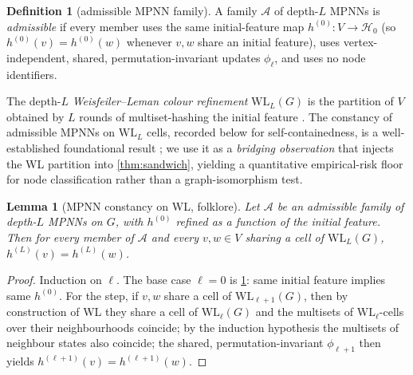 \documentclass[10pt]{article}
\newtheorem{lemma}[theorem]{Lemma}
\theoremstyle{definition}
\newtheorem{definition}[theorem]{Definition}
\theoremstyle{remark}
\begin{document}
\begin{definition}[admissible MPNN family]\label{def:admissible}
A family $\mathcal{A}$ of depth-$L$ MPNNs is \emph{admissible} if
every member uses the same initial-feature map
$h^{(0)} : V \to \mathcal{H}_{0}$ (so $h^{(0)}(v) = h^{(0)}(w)$
whenever $v, w$ share an initial feature), uses
vertex-independent, shared, permutation-invariant updates
$\phi_{\ell}$, and uses no node identifiers.
\end{definition}

The depth-$L$ \emph{Weisfeiler--Leman colour refinement}
$\mathrm{WL}_{L}(G)$ is the partition of $V$ obtained by $L$
rounds of multiset-hashing the initial feature
\citep{morris2019wl,xu2019gin}. The constancy of admissible
MPNNs on $\mathrm{WL}_{L}$ cells, recorded below for
self-containedness, is a well-established foundational result
\citep{xu2019gin,morris2019wl}; we use it as a
\emph{bridging observation} that injects the WL partition into
\cref{thm:sandwich}, yielding a quantitative empirical-risk
floor for node classification rather than a graph-isomorphism
test.

\begin{lemma}[MPNN constancy on WL, folklore]\label{lem:mpnn-wl}
Let $\mathcal{A}$ be an admissible family of depth-$L$ MPNNs on
$G$, with $h^{(0)}$ refined as a function of the initial feature.
Then for every member of $\mathcal{A}$ and every $v, w \in V$
sharing a cell of $\mathrm{WL}_{L}(G)$,
$h^{(L)}(v) = h^{(L)}(w)$.
\end{lemma}

\begin{proof}
Induction on $\ell$. The base case $\ell = 0$ is
\cref{def:admissible}: same initial feature implies same
$h^{(0)}$. For the step, if $v, w$ share a cell of
$\mathrm{WL}_{\ell+1}(G)$, then by construction of WL they share
a cell of $\mathrm{WL}_{\ell}(G)$ and the multisets of
$\mathrm{WL}_{\ell}$-cells over their neighbourhoods coincide;
by the induction hypothesis the multisets of neighbour states
also coincide; the shared, permutation-invariant
$\phi_{\ell+1}$ then yields $h^{(\ell+1)}(v) = h^{(\ell+1)}(w)$.
\end{proof}
\end{document}
